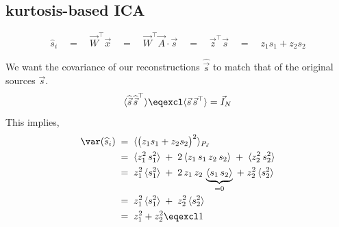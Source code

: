 
\clearpage

\subsection{kurtosis-based ICA}

\begin{frame}{\subsecname}


\begin{equation*}
\widehat{s}_i \quad 
= \quad \vec{W}^\top \vec{x} \quad 
= \quad  \vec{W}^\top \vec{A} \cdot \vec{s} \quad 
=  \quad \vec{z}^\top \vec{s} \quad 
= \quad z_1 s_1 + z_2 s_2
\end{equation*}

\vspace{1mm}
We want the covariance of our reconstructions $\widehat{\vec s}$ to match that of the original sources $\vec s$.
\begin{equation*}
\langle \widehat{\vec s} \, \widehat{\vec s}^\top \rangle \eqexcl \langle \vec s \, \vec s^\top \rangle = \vec I_N
\end{equation*}
This implies,
\begin{align}
\var(\widehat{s}_i)
 \; &= \; \langle \big( z_1 s_1 + z_2 s_2 \big)^2 \rangle_{P_{\vec s}}\\
 \; &= \; \langle z_1^2 \, s_1^2 \rangle \;+\; 2 \, \langle z_1\, s_1\, z_2 \, s_2 \rangle \;+\; \langle z_2^2 \, s_2^2 \rangle \\
 \; &= \; z_1^2 \, \langle s_1^2 \rangle \;+\; 2 \, z_1\, z_2 \, \underbrace{\langle  s_1\,  s_2 \rangle}_{= 0} \;+\; z_2^2 \, \langle  s_2^2 \rangle \\
 \; &= \; z_1^2 \, \langle s_1^2 \rangle \;+\; z_2^2 \,\langle s_2^2 \rangle \\
 \; &= \; z_1^2 + z_2^2 \eqexcl 1
\end{align}

\end{frame}

